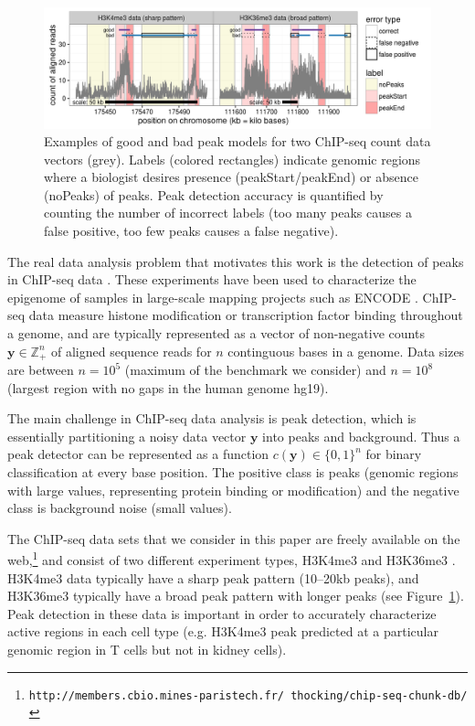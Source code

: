 \documentclass[aoas]{imsart}
\newcommand{\url}[1]{\texttt{#1}}
\newcommand{\ZZ}{\mathbb Z}
\begin{document}
\begin{figure}[t!]
  \centering
  \includegraphics[width=\textwidth]{figure-good-bad}
\vskip -0.5cm
  \caption{
    Examples of \textcolor{good}{good} and \textcolor{bad}{bad} 
    peak models for two ChIP-seq 
    count data vectors (grey). Labels (colored rectangles) indicate genomic 
    regions where a biologist desires presence (peakStart/peakEnd) 
    or absence (noPeaks) of peaks. Peak detection accuracy is quantified by 
    counting the number of incorrect labels
    (too many peaks causes a false positive, 
     too few peaks causes a false negative).
}
  \label{fig:good-bad}
\end{figure}

The real data analysis problem that motivates this work is the
detection of peaks in ChIP-seq data \citep{practical}. These
experiments have been used to characterize the epigenome of samples in
large-scale mapping projects such as ENCODE
\citep{ENCODE}. ChIP-seq data measure histone modification or
transcription factor binding throughout a genome, and are typically
represented as a vector of non-negative counts $\mathbf y\in\ZZ_+^n$
of aligned sequence reads for $n$ continguous bases in a genome. Data
sizes are between $n=10^5$ (maximum of the benchmark we consider) and
$n=10^8$ (largest region with no gaps in the human genome hg19).

The main challenge in ChIP-seq data analysis is peak detection, which
is essentially partitioning a noisy data vector $\mathbf y$ into peaks and
background. Thus a peak detector can be represented as a function
$c(\mathbf y)\in\{0,1\}^n$ for binary classification at every base
position. The positive class is peaks (genomic regions with large
values, representing protein binding or modification) and the negative
class is background noise (small values).

The ChIP-seq data sets that we consider in this paper are freely
available on the web,\footnote{
  \url{http://members.cbio.mines-paristech.fr/~thocking/chip-seq-chunk-db/}}
and consist of two different experiment types, H3K4me3 and H3K36me3
\citep{HOCKING2016-chipseq}. H3K4me3 data typically have a sharp peak
pattern (10--20kb peaks), and H3K36me3 typically have a broad peak
pattern with longer peaks (see Figure~\ref{fig:good-bad}). Peak
detection in these data is important in order to accurately
characterize active regions in each cell type (e.g. H3K4me3 peak
predicted at a particular genomic region in T cells but not in kidney
cells).
\end{document}
